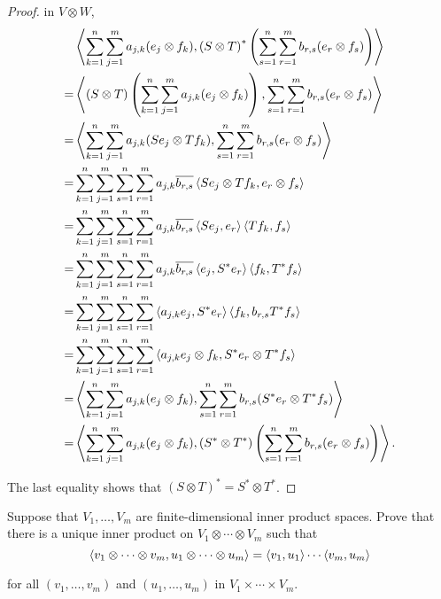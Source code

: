 \begin{proof}
    in $V\otimes W$,
    \begingroup
    \allowdisplaybreaks{}
    \begin{align*}
          & \left\langle{\sum^{n}_{k=1}\sum^{m}_{j=1}a_{j,k}(e_{j}\otimes f_{k}), {(S\otimes T)}^{*}\left(\sum^{n}_{s=1}\sum^{m}_{r=1}b_{r,s}(e_{r}\otimes f_{s})\right)}\right\rangle    \\
        = & \left\langle{(S\otimes T)\left(\sum^{n}_{k=1}\sum^{m}_{j=1}a_{j,k}(e_{j}\otimes f_{k})\right), \sum^{n}_{s=1}\sum^{m}_{r=1}b_{r,s}(e_{r}\otimes f_{s})}\right\rangle          \\
        = & \left\langle{\sum^{n}_{k=1}\sum^{m}_{j=1}a_{j,k}(Se_{j}\otimes Tf_{k}), \sum^{n}_{s=1}\sum^{m}_{r=1}b_{r,s}(e_{r}\otimes f_{s})}\right\rangle                                 \\
        = & \sum^{n}_{k=1}\sum^{m}_{j=1}\sum^{n}_{s=1}\sum^{m}_{r=1}a_{j,k}\overline{b_{r,s}}\left\langle{Se_{j}\otimes Tf_{k}, e_{r}\otimes f_{s}}\right\rangle                              \\
        = & \sum^{n}_{k=1}\sum^{m}_{j=1}\sum^{n}_{s=1}\sum^{m}_{r=1}a_{j,k}\overline{b_{r,s}}\left\langle{Se_{j}, e_{r}}\right\rangle\left\langle{Tf_{k}, f_{s}}\right\rangle                                \\
        = & \sum^{n}_{k=1}\sum^{m}_{j=1}\sum^{n}_{s=1}\sum^{m}_{r=1}a_{j,k}\overline{b_{r,s}}\left\langle{e_{j}, S^{*}e_{r}}\right\rangle\left\langle{f_{k}, T^{*}f_{s}}\right\rangle                        \\
        = & \sum^{n}_{k=1}\sum^{m}_{j=1}\sum^{n}_{s=1}\sum^{m}_{r=1}\left\langle{a_{j,k}e_{j}, S^{*}e_{r}}\right\rangle\left\langle{f_{k}, b_{r,s}T^{*}f_{s}}\right\rangle                               \\
        = & \sum^{n}_{k=1}\sum^{m}_{j=1}\sum^{n}_{s=1}\sum^{m}_{r=1}\left\langle{a_{j,k}e_{j}\otimes f_{k}, S^{*}e_{r}\otimes T^{*}f_{s}}\right\rangle                                    \\
        = & \left\langle{\sum^{n}_{k=1}\sum^{m}_{j=1}a_{j,k}(e_{j}\otimes f_{k}), \sum^{n}_{s=1}\sum^{m}_{r=1}b_{r,s}(S^{*}e_{r}\otimes T^{*}f_{s})}\right\rangle                         \\
        = & \left\langle{\sum^{n}_{k=1}\sum^{m}_{j=1}a_{j,k}(e_{j}\otimes f_{k}), (S^{*}\otimes T^{*})\left(\sum^{n}_{s=1}\sum^{m}_{r=1}b_{r,s}(e_{r}\otimes f_{s})\right)}\right\rangle.
    \end{align*}
    \endgroup

    The last equality shows that ${(S\otimes T)}^{*} = S^{*}\otimes T^{*}$.
\end{proof}
\newpage

\begin{exercise}\label{chapter9:sectionD:exercise12}
    Suppose that $V_{1}, \ldots, V_{m}$ are finite-dimensional inner product spaces. Prove that there is a unique inner product on $V_{1}\otimes \cdots\otimes V_{m}$ such that
    \[
        \left\langle{v_{1}\otimes \cdots\otimes v_{m}, u_{1}\otimes \cdots\otimes u_{m}}\right\rangle = \left\langle{v_{1}, u_{1}}\right\rangle\cdots\left\langle{v_{m}, u_{m}}\right\rangle
    \]

    for all $(v_{1}, \ldots, v_{m})$ and $(u_{1}, \ldots, u_{m})$ in $V_{1}\times\cdots\times V_{m}$.
\end{exercise}

